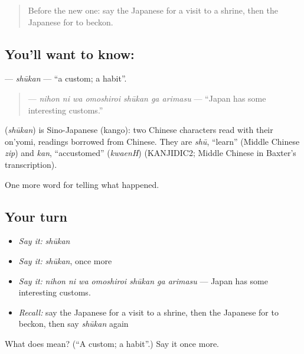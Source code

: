 \begin{quote}
Before the new one: say the Japanese for a visit to a shrine, then the Japanese for to beckon.
\end{quote}

\subsection*{You'll want to know: }
\textbf{} — \emph{shūkan} — \textquotedblleft{}a custom; a habit\textquotedblright{}.

\begin{quote}
\textbf{   } — \emph{nihon ni wa omoshiroi shūkan ga arimasu} — \textquotedblleft{}Japan has some interesting customs.\textquotedblright{}
\end{quote}

\begin{cousinweb}
\textbf{} (\emph{shūkan}) is Sino-Japanese (kango): two Chinese characters read with their on'yomi, readings borrowed from Chinese. They are \emph{shū}, \textquotedblleft{}learn\textquotedblright{} (Middle Chinese \emph{zip}) and \emph{kan}, \textquotedblleft{}accustomed\textquotedblright{} (\emph{kwaenH}) (KANJIDIC2; Middle Chinese in Baxter's transcription).
\end{cousinweb}

\begin{grammarlens}[title={What you've built}]
One more word for telling what happened.
\end{grammarlens}

\subsection*{Your turn}
\begin{itemize}
\raggedright
  \item \emph{Say it:} \emph{shūkan}
  \item \emph{Say it:} \emph{shūkan}, once more
  \item \emph{Say it:} \emph{nihon ni wa omoshiroi shūkan ga arimasu} — Japan has some interesting customs.
  \item \emph{Recall:} say the Japanese for a visit to a shrine, then the Japanese for to beckon, then say \emph{shūkan} again
\end{itemize}

\begin{tcolorbox}[breakable,colback=teal!4,colframe=teal!35!black,title={Before you move on}]
What does  mean? (\textquotedblleft{}A custom; a habit\textquotedblright{}.) Say it once more.
\end{tcolorbox}

